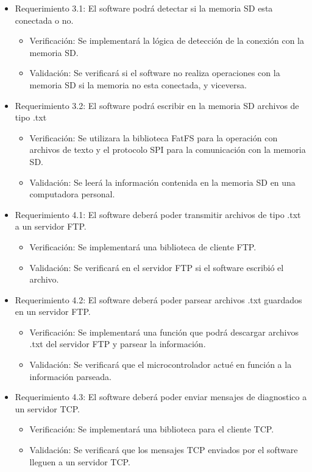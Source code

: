 \documentclass[
11pt, %
]{charter}
\begin{document}
\begin{itemize}
\item Requerimiento 3.1: El software podrá detectar si la memoria SD esta conectada o no.
	\begin{itemize}
		\item Verificación: Se implementará la lógica de detección de la conexión con la memoria SD.
		\item Validación: Se verificará si el software no realiza operaciones con la memoria SD si la memoria no esta conectada, y viceversa.
	\end{itemize}	
\item Requerimiento 3.2: El software podrá escribir en la memoria SD archivos de tipo .txt
	\begin{itemize}
		\item Verificación: Se utilizara la biblioteca FatFS para la operación con archivos de texto y el protocolo SPI para la comunicación con la memoria SD. 
		\item Validación: Se leerá la información contenida en la memoria SD en una computadora personal.
	\end{itemize}
\item Requerimiento 4.1: El software deberá poder transmitir archivos de tipo .txt a un servidor FTP.
	\begin{itemize}
		\item Verificación: Se implementará una biblioteca de cliente FTP.
		\item Validación: Se verificará en el servidor FTP si el software escribió el archivo.
	\end{itemize}
\item Requerimiento 4.2: El software deberá poder parsear archivos .txt guardados en un servidor FTP.
	\begin{itemize}
		\item Verificación: Se implementará una función que podrá descargar  archivos .txt del servidor FTP y parsear la información.
		\item Validación: Se verificará que el microcontrolador actué en función a la información parseada.
	\end{itemize}	
\item Requerimiento 4.3: El software deberá poder enviar mensajes de diagnostico a un servidor TCP.
	\begin{itemize}
		\item Verificación: Se implementará una biblioteca para el cliente TCP.
		\item Validación: Se verificará que los mensajes TCP enviados por el software lleguen a un servidor TCP.
	\end{itemize}			
\end{itemize}
\end{document}
